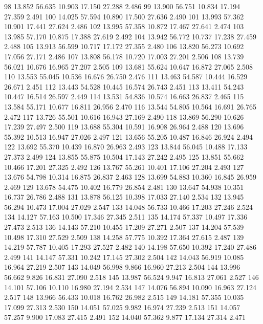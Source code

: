 \documentclass[a4paper,11pt]{scrartcl}
\begin{document}
\begin{Schunk}
\begin{Soutput}
98  13.852   56.635 10.903 17.150 27.288  2.486
99  13.900   56.751 10.834 17.194 27.359  2.491
100 14.025   57.594 10.890 17.500 27.636  2.490
101 13.993   57.362 10.901 17.441 27.624  2.486
102 13.995   57.358 10.872 17.467 27.641  2.474
103 13.985   57.170 10.875 17.388 27.619  2.492
104 13.942   56.772 10.737 17.238 27.459  2.488
105 13.913   56.599 10.717 17.172 27.355  2.480
106 13.820   56.273 10.692 17.056 27.171  2.486
107 13.808   56.178 10.720 17.003 27.201  2.506
108 13.739   56.021 10.676 16.965 27.207  2.505
109 13.681   55.624 10.647 16.872 27.065  2.508
110 13.553   55.045 10.536 16.676 26.750  2.476
111 13.463   54.587 10.444 16.529 26.671  2.451
112 13.443   54.528 10.445 16.574 26.743  2.451
113 13.411   54.243 10.447 16.514 26.597  2.449
114 13.531   54.836 10.574 16.663 26.837  2.465
115 13.584   55.171 10.677 16.811 26.956  2.470
116 13.544   54.805 10.564 16.691 26.765  2.472
117 13.726   55.501 10.616 16.943 27.169  2.490
118 13.869   56.290 10.626 17.239 27.497  2.500
119 13.688   55.304 10.591 16.908 26.964  2.488
120 13.696   55.392 10.513 16.947 27.026  2.497
121 13.656   55.205 10.487 16.846 26.924  2.494
122 13.692   55.370 10.439 16.870 26.963  2.493
123 13.844   56.045 10.488 17.133 27.373  2.499
124 13.855   55.875 10.504 17.143 27.242  2.495
125 13.851   55.662 10.466 17.201 27.325  2.492
126 13.767   55.261 10.401 17.106 27.204  2.493
127 13.676   54.798 10.314 16.875 26.837  2.463
128 13.699   54.883 10.360 16.845 26.959  2.469
129 13.678   54.475 10.402 16.779 26.854  2.481
130 13.647   54.938 10.351 16.737 26.786  2.488
131 13.878   56.125 10.398 17.033 27.140  2.534
132 13.945   56.294 10.473 17.004 27.029  2.547
133 14.048   56.733 10.466 17.203 27.246  2.524
134 14.127   57.163 10.500 17.346 27.345  2.511
135 14.174   57.337 10.497 17.336 27.473  2.513
136 14.143   57.210 10.455 17.209 27.271  2.507
137 14.204   57.539 10.498 17.310 27.529  2.509
138 14.258   57.775 10.392 17.364 27.615  2.487
139 14.219   57.787 10.405 17.293 27.527  2.482
140 14.198   57.650 10.392 17.240 27.486  2.499
141 14.147   57.331 10.242 17.145 27.302  2.504
142 14.043   56.919 10.085 16.964 27.219  2.507
143 14.049   56.998  9.866 16.960 27.213  2.504
144 13.996   56.662  9.826 16.831 27.090  2.518
145 13.987   56.524  9.947 16.813 27.061  2.527
146 14.101   57.106 10.110 16.980 27.194  2.534
147 14.076   56.894 10.090 16.963 27.124  2.517
148 13.966   56.433 10.018 16.762 26.982  2.515
149 14.181   57.355 10.035 17.099 27.313  2.530
150 14.051   57.025  9.982 16.974 27.239  2.513
151 14.057   57.257  9.900 17.083 27.415  2.491
152 14.040   57.362  9.877 17.134 27.314  2.471

\end{Soutput}
\end{Schunk}
\end{document}
